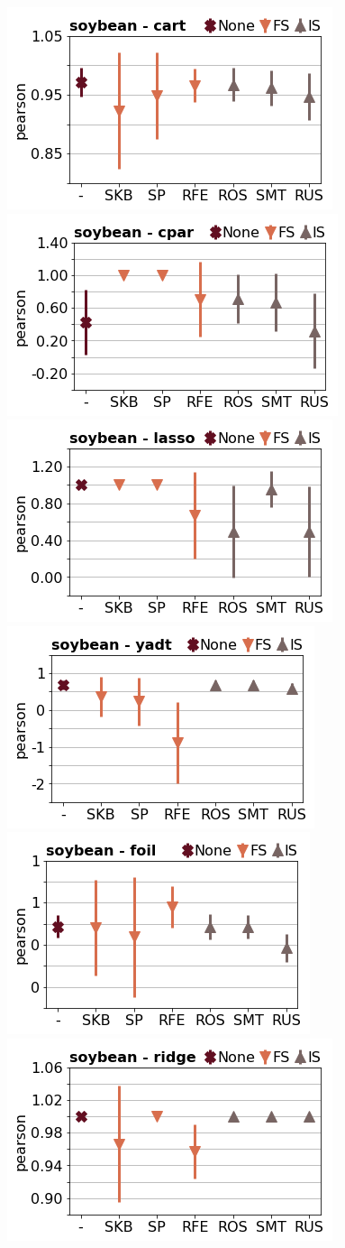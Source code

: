 \documentclass[runningheads,a4paper]{llncs}
\begin{document}
\begin{figure}[!h]
\includegraphics[width=0.32\linewidth]{fig/preps_soybean_DT_sklearn_sample_pearson.png}
\includegraphics[width=0.32\linewidth]{fig/preps_soybean_RB_cpar_sample_pearson.png}
\includegraphics[width=0.32\linewidth]{fig/preps_soybean_LM_lasso_sample_pearson.png}
\includegraphics[width=0.32\linewidth]{fig/preps_soybean_DT_yadt_sample_pearson.png}
\includegraphics[width=0.32\linewidth]{fig/preps_soybean_RB_foil_sample_pearson.png}
\includegraphics[width=0.32\linewidth]{fig/preps_soybean_LM_ridge_sample_pearson.png}
\end{figure}
\end{document}
